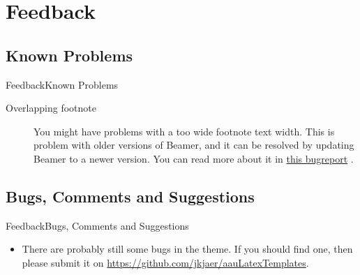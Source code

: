 \documentclass[10pt]{beamer}
\newcommand{\chref}[2]{%
  \href{#1}{{\usebeamercolor[bg]{Aalborg}#2}}%
}
\begin{document}
\section{Feedback}
\subsection{Known Problems}
\begin{frame}{Feedback}{Known Problems}
  \begin{description}
    \item[Overlapping footnote] You might have problems with a too wide footnote text width. This is problem with older versions of Beamer, and it can be resolved by updating Beamer to a newer version. You can read more about it in \chref{https://bitbucket.org/rivanvx/beamer/issue/200/width-of-footnote-in-a-sidebar-theme}{this bugreport}.
  \end{description}
\end{frame}

\subsection{Bugs, Comments and Suggestions}
\begin{frame}{Feedback}{Bugs, Comments and Suggestions}
  \begin{itemize}
    \item<1-> There are probably still some bugs in the theme. If you should find one, then please submit it on \url{https://github.com/jkjaer/aauLatexTemplates}.
  \end{itemize}
\end{frame}

{\aauwavesbg%
\begin{frame}%
\end{frame}}
\end{document}
